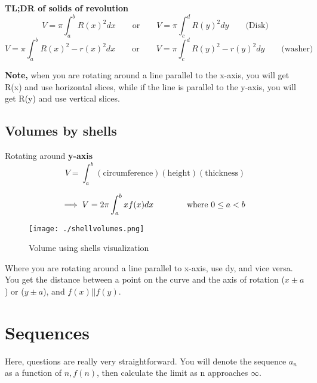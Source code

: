 \documentclass{article}
\begin{document}
\textbf{TL;DR of solids of revolution}
\[
	V = \pi \int^{b}_{a} R(x)^2 dx  \qquad \text{or} \qquad V = \pi \int^{d}_{c} R(y)^2 dy \qquad \text{(Disk)}
\]
\[
	V = \pi \int^{b}_{a} R(x)^2 - r(x)^2 dx \qquad \text{or} \qquad V = \pi \int^{d}_{c} R(y)^2 - r(y)^2 dy
	\qquad \text{(washer)}
\]

\textbf{Note,} when you are rotating around a line parallel to the x-axis, you will get R(x) and use horizontal slices, while if the line is parallel to the y-axis, you will get R(y) and use vertical slices. 


\newpage

\subsection{Volumes by shells}


Rotating around \textbf{y-axis}
\[
	V = \int^{b}_{a} (\text{circumference}) (\text{height}) (\text{thickness})  
\]

\[
\implies	V = 2\pi \int^{b}_{a} x f(x) dx \qquad \qquad \text{where $ 0 \leq a < b $ } 
\]

\begin{figure}[h!]
\centering
\texttt{[image: ./shellvolumes.png]}
\caption{Volume using shells visualization}
\label{fig:-shellvolumes-png}
\end{figure}	

Where you are rotating around a line parallel to x-axis, use dy, and vice versa. 
You get the distance between a point on the curve and the axis of rotation ($x\pm a$) or ($y\pm a$), and $ f(x) | | f(y) $. 
\newpage

\section{Sequences}

Here, questions are really very straightforward. You will denote the sequence $ a_n $	as a function of $ n, f(n) $, then calculate the limit as n approaches $\infty$.
\end{document}
